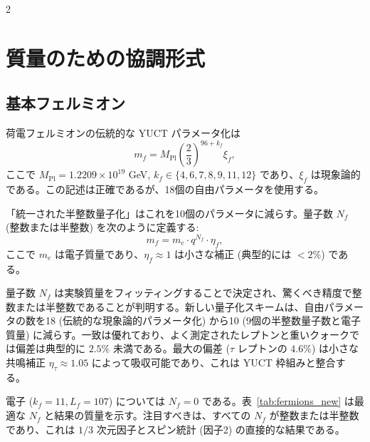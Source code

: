 \documentclass[11pt,a4paper]{article}
\theoremstyle{remark}
\begin{document}
\begin{multicols}{2}
		\section{質量のための協調形式}
		\label{sec:formalism}
		
		\subsection{基本フェルミオン}
		
		荷電フェルミオンの伝統的な YUCT パラメータ化は
		\begin{equation}
			m_f = M_{\mathrm{Pl}} \left( \frac{2}{3} \right)^{96 + k_f} \xi_f,
			\label{eq:mass_fermion}
		\end{equation}
		ここで \(M_{\mathrm{Pl}} = 1.2209\times 10^{19}\) GeV, \(k_f \in \{4,6,7,8,9,11,12\}\) であり、\(\xi_f\) は現象論的である。この記述は正確であるが、18個の自由パラメータを使用する。
		
		「統一された半整数量子化」はこれを10個のパラメータに減らす。量子数 \(N_f\) (整数または半整数) を次のように定義する:
		\begin{equation}
			m_f = m_e \cdot q^{N_f} \cdot \eta_f,
			\label{eq:mass_quantized}
		\end{equation}
		ここで \(m_e\) は電子質量であり、\(\eta_f \approx 1\) は小さな補正 (典型的には \(<2\%\)) である。
		
		量子数 \(N_f\) は実験質量をフィッティングすることで決定され、驚くべき精度で整数または半整数であることが判明する。新しい量子化スキームは、自由パラメータの数を18 (伝統的な現象論的パラメータ化) から10 (9個の半整数量子数と電子質量) に減らす。一致は優れており、よく測定されたレプトンと重いクォークでは偏差は典型的に \(2.5\%\) 未満である。最大の偏差 (\(\tau\) レプトンの \(4.6\%\)) は小さな共鳴補正 \(\eta_\tau \approx 1.05\) によって吸収可能であり、これは YUCT 枠組みと整合する。
		
		電子 (\(k_f=11, L_f=107\)) については \(N_f=0\) である。表~\ref{tab:fermions_new} は最適な \(N_f\) と結果の質量を示す。注目すべきは、すべての \(N_f\) が整数または半整数であり、これは \(1/3\) 次元因子とスピン統計 (因子2) の直接的な結果である。
		

\end{multicols}
\end{document}
